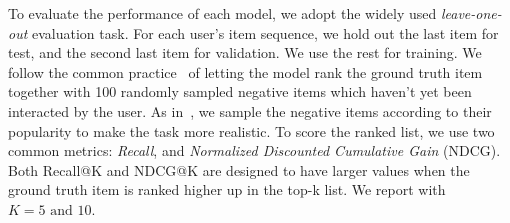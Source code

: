 To evaluate the performance of each model, we adopt the widely used \textit{leave-one-out} evaluation task. For each user's item sequence, we hold out the last item for test, and the second last item for validation. We use the rest for training. We follow the common practice~\cite{SASRec, TISASRec, BERT4Rec} of letting the model rank the ground truth item together with 100 randomly sampled negative items which haven't yet been interacted by the user. As in~\cite{BERT4Rec}, we sample the negative items according to their popularity to make the task more realistic.
To score the ranked list, we use two common metrics: \textit{Recall}, and \textit{Normalized Discounted Cumulative Gain} (NDCG). Both Recall@K and NDCG@K are designed to have larger values when the ground truth item is ranked higher up in the top-k list. We report with $K=5\text{ and }10$.
